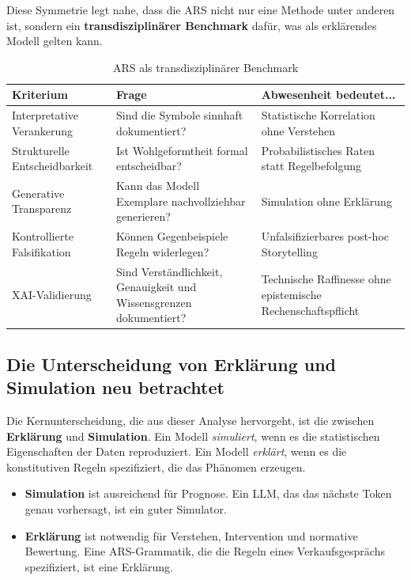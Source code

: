 \documentclass[12pt,a4paper]{article}
\begin{document}
Diese Symmetrie legt nahe, dass die ARS nicht nur eine Methode unter anderen 
ist, sondern ein \textbf{transdisziplinärer Benchmark} dafür, was als 
erklärendes Modell gelten kann.

\begin{table}[H]
\centering
\caption{ARS als transdisziplinärer Benchmark}
\label{tab:benchmark}
\begin{tabular}{@{} p{3cm} p{4cm} p{6cm} @{}}
\toprule
\textbf{Kriterium} & \textbf{Frage} & \textbf{Abwesenheit bedeutet...} \\
\midrule
Interpretative Verankerung & Sind die Symbole sinnhaft dokumentiert? & Statistische Korrelation ohne Verstehen \\
Strukturelle Entscheidbarkeit & Ist Wohlgeformtheit formal entscheidbar? & Probabilistisches Raten statt Regelbefolgung \\
Generative Transparenz & Kann das Modell Exemplare nachvollziehbar generieren? & Simulation ohne Erklärung \\
Kontrollierte Falsifikation & Können Gegenbeispiele Regeln widerlegen? & Unfalsifizierbares post-hoc Storytelling \\
XAI-Validierung & Sind Verständlichkeit, Genauigkeit und Wissensgrenzen dokumentiert? & Technische Raffinesse ohne epistemische Rechenschaftspflicht \\
\bottomrule
\end{tabular}
\end{table}

\subsection{Die Unterscheidung von Erklärung und Simulation neu betrachtet}

Die Kernunterscheidung, die aus dieser Analyse hervorgeht, ist die zwischen 
\textbf{Erklärung} und \textbf{Simulation}. Ein Modell \textit{simuliert}, 
wenn es die statistischen Eigenschaften der Daten reproduziert. Ein Modell 
\textit{erklärt}, wenn es die konstitutiven Regeln spezifiziert, die das 
Phänomen erzeugen.

\begin{itemize}
    \item \textbf{Simulation} ist ausreichend für Prognose. Ein LLM, das das 
    nächste Token genau vorhersagt, ist ein guter Simulator.
    \item \textbf{Erklärung} ist notwendig für Verstehen, Intervention und 
    normative Bewertung. Eine ARS-Grammatik, die die Regeln eines Verkaufsgesprächs 
    spezifiziert, ist eine Erklärung.
\end{itemize}
\end{document}
